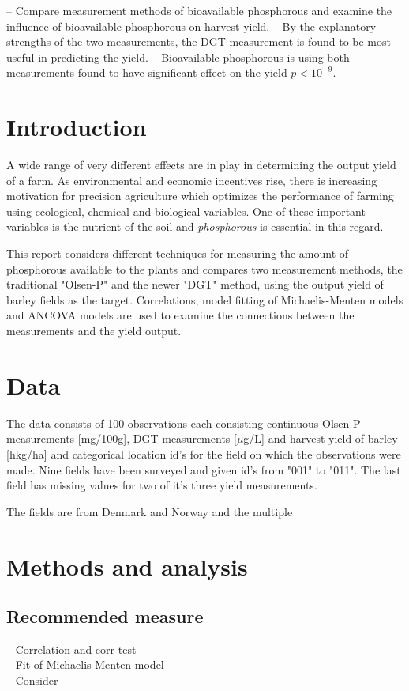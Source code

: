 \documentclass[12pt,fleqn]{article}
\title{}
\author{Asger Schultz}
\date{\today}
\begin{document}
\maketitle
-- Compare measurement methods of bioavailable phosphorous and examine the influence of bioavailable phosphorous on harvest yield. 
-- By the explanatory strengths of the two measurements, the DGT measurement is found to be most useful in predicting the yield.
-- Bioavailable phosphorous is using both measurements found to have significant effect on the yield \(p<10^{-9}\).
\tableofcontents
\newpage 
\section{Introduction}
A wide range of very different effects are in play in determining the output yield of a farm.
As environmental and economic incentives rise, there is increasing motivation for precision agriculture which optimizes the performance of farming using ecological, chemical and biological variables.
One of these important variables is the nutrient of the soil and \textit{phosphorous} is essential in this regard.


This report considers different techniques for measuring the amount of phosphorous available to the plants and compares two measurement methods, the traditional "Olsen-P" and the newer "DGT" method, using the output yield of barley fields as the target.  
Correlations, model fitting of Michaelis-Menten models and ANCOVA models are used to examine the connections between the measurements and the yield output.
\section{Data}
The data consists of 100 observations each consisting continuous  Olsen-P measurements [mg/100g], DGT-measurements [\(\mu\)g/L] and harvest yield of barley [hkg/ha] and categorical location id's for the field on which the observations were made. Nine fields have been surveyed and given id's from "001" to "011". The last field has missing values for two of it's three yield measurements.  

The fields are from Denmark and Norway and the multiple 
\section{Methods and analysis}
\subsection{Recommended measure}
-- Correlation and corr test\\
-- Fit of Michaelis-Menten model\\
-- Consider 
\end{document}
